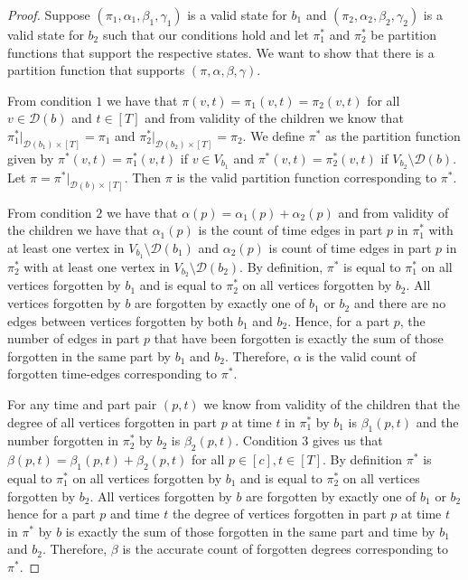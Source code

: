 \documentclass[runningheads]{llncs}
\begin{document}
\begin{proof}
    Suppose $(\pi_1,\alpha_1,\beta_1,\gamma_1)$ is a valid state for $b_1$ and $(\pi_2,\alpha_2,\beta_2,\gamma_2)$ is a valid state for $b_2$ such that our conditions hold and let $\pi^*_1$ and $\pi^*_2$ be partition functions that support the respective states. We want to show that there is a partition function that supports $(\pi,\alpha,\beta,\gamma)$.

    From condition $1$ we have that $\pi(v,t)=\pi_1(v,t)=\pi_2(v,t)$ for all $v\in \mathcal{D}(b)$ and $t\in [T]$ and from validity of the children we know that $\pi^*_1|_{\mathcal{D}(b_1)\times [T]}=\pi_1$ and $\pi^*_2|_{\mathcal{D}(b_2)\times [T]}=\pi_2$.
    We define $\pi^*$ as the partition function given by $\pi^*(v,t)=\pi_1^*(v,t)$ if $v \in V_{b_1} $ and $\pi^*(v,t)=\pi_2^*(v,t)$ if $V_{b_2} \setminus \mathcal{D}(b)$. Let $\pi=\pi^*| _{\mathcal{D}(b)\times [T]}$. Then $\pi$ is the valid partition function corresponding to $\pi^*$.

    From condition $2$ we have that $\alpha(p)=\alpha_{1}(p)+\alpha_2(p)$ and from validity of the children we have that $\alpha_1(p)$ is the count of time edges in part $p$ in $\pi^*_1$ with at least one vertex in $V_{b_1} \setminus \mathcal{D}(b_1)$ and $\alpha_2(p)$ is count of time edges in part $p$ in $\pi^*_2$ with at least one vertex in $V_{b_2} \setminus \mathcal{D}(b_2)$.
By definition, $\pi^*$ is equal to $\pi^*_1$ on all vertices forgotten by $b_1$ and is equal to $\pi^*_2$ on all vertices forgotten by $b_2$. All vertices forgotten by $b$ are forgotten by exactly one of $b_1$ or $b_2$ and there are no edges between vertices forgotten by both $b_1$ and $b_2$. 
Hence, for a part $p$, the number of edges in part $p$ that have been forgotten is exactly the sum of those forgotten in the same part by $b_1$ and $b_2$.
Therefore, $\alpha$ is the valid count of forgotten time-edges corresponding to $\pi^*$.

    For any time and part pair $(p,t)$ we know from validity of the children that the degree of all vertices forgotten in part $p$ at time $t$ in $\pi^*_1$ by $b_1$ is $\beta_1(p,t)$ and the number forgotten in $\pi^*_2$ by $b_2$ is $\beta_2(p,t)$. Condition $3$ gives us that $\beta(p,t)=\beta_1(p,t)+\beta_2(p,t)$ for all $p \in [c],t\in [T]$. 
    By definition $\pi^*$ is equal to $\pi^*_1$ on all vertices forgotten by $b_1$ and is equal to $\pi^*_2$ on all vertices forgotten by $b_2$. All vertices forgotten by $b$ are forgotten by exactly one of $b_1$ or $b_2$ hence for a part $p$ and time $t$ the degree of vertices forgotten in part $p$ at time $t$ in $\pi^*$ by $b$ is exactly the sum of those forgotten in the same part and time by $b_1$ and $b_2$.
    Therefore, $\beta$ is the accurate count of forgotten degrees corresponding to $\pi^*$.
    

\end{proof}
\end{document}
